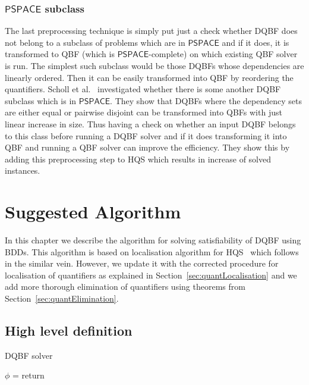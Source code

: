 \documentclass[
  digital, %
  color,
  twoside, %
  table,   %
  nolof,     %
  nolot,     %
]{fithesis3}
\theoremstyle{definition}
\theoremstyle{remark}
\newcommand{\ComplexityFont}[1]{\mathsf{#1}}
\newcommand{\PSPACE}{\ComplexityFont{PSPACE}}
\begin{document}
\subsection{\texorpdfstring{$\PSPACE$}{PSPACE} subclass}
The last preprocessing technique is simply put just a check whether DQBF does not belong to a subclass of problems which are in $\PSPACE$ and if it does, it is transformed to QBF (which is $\PSPACE$-complete) on which existing QBF solver is run. The simplest such subclass would be those DQBFs whose dependencies are linearly ordered. Then it can be easily transformed into QBF by reordering the quantifiers. Scholl et al.~\cite{PSPACEsubclass} investigated whether there is some another DQBF subclass which is in $\PSPACE$. They show that DQBFs where the dependency sets are either equal or pairwise disjoint can be transformed into QBFs with just linear increase in size. Thus having a check on whether an input DQBF belongs to this class before running a DQBF solver and if it does transforming it into QBF and running a QBF solver can improve the efficiency. They show this by adding this preprocessing step to HQS which results in increase of solved instances.

\chapter{Suggested Algorithm}
\label{chap:algorithm}

In this chapter we describe the algorithm for solving satisfiability of DQBF using BDDs. This algorithm is based on localisation algorithm for HQS~\cite{HQSquantifierLocalisation} which follows in the similar vein. However, we update it with the corrected procedure for localisation of quantifiers as explained in Section~\ref{sec:quantLocalisation} and we add more thorough elimination of quantifiers using theorems from Section~\ref{sec:quantElimination}.

\section{High level definition}
\begin{algorithm}
  \caption{DQBF solver}
  \label{alg:general}
  \begin{algorithmic}[1]
    \State {}
    \State $\phi$ = 
    \State {} \label{alg:general:elimination}
    \State return 
    \EndFunction
  \end{algorithmic}
\end{algorithm}
\end{document}
